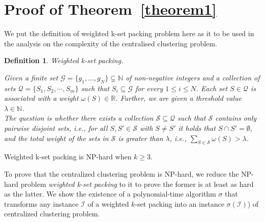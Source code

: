 \documentclass[10pt,journal,compsoc]{IEEEtran}
\makeatletter
\theoremstyle{mytheoremstyle}
\theoremstyle{mytheoremstyle}
\theoremstyle{mytheoremstyle}
\newtheorem{mydef}{Definition}%
\renewenvironment{proof}[1][\proofname]{%
      \par\pushQED{\qed}\fontfamily{ptm}\selectfont%
      \topsep6\p@\@plus6\p@\relax
      \trivlist\item[\hskip\labelsep\bfseries#1\@addpunct{.}]%
      \ignorespaces
    }{%
      \popQED\endtrivlist\@endpefalse
    }
\makeatother
\begin{document}
\section*{Proof of Theorem~\ref{theorem1}}
\label{proof_theorem1}
\begin{proof}
We put the definition of weighted k-set packing problem here as it to be used in the analysis on the complexity of the centralised clustering problem.

\begin{mydef}
\label{def_kset_packing}
\textit{Weighted k-set packing.} 

Given a finite set $\mathcal{G} = \{ g_1, \ldots , g_N \} \subsetneq \mathbb{N}$ of non-negative integers and a collection of sets $\mathcal{Q}=\{S_1,S_2,\cdots,S_m\}$ such that $S_i \subseteq \mathcal{G}$ for every $1 \leq i \leq N$.
Each set $S \in \mathcal{Q}$ is associated with a weight $\omega(S) \in \mathbb{R}$.
Further, we are given a threshold value $\lambda \in \mathbb{N}$.\\
The question is whether there exists a collection $\mathcal{S} \subseteq \mathcal{Q}$ such that $\mathcal{S}$ contains only pairwise disjoint sets, i.e., for all $S, S' \in \mathcal{S}$ with $S \neq S'$ it holds that $S \cap S' = \emptyset$, and the total weight of the sets in $\mathcal{S}$ is greater than $\lambda$, i.e., $\sum_{S \in \mathcal{S}} \omega(S) > \lambda$.
\end{mydef}

Weighted k-set packing is NP-hard when $k\geqslant 3$.~\cite{Computers_a_Intractability}

To prove that the centralized clustering problem is NP-hard, we reduce the NP-hard problem \textit{weighted k-set packing} to it to prove the former is at least as hard as the latter.
We show the existence of a polynomial-time algorithm $\sigma$ that transforms any instance $\mathcal{I}$ of a weighted $k$-set packing into an instance $\sigma(\mathcal{I})$) of centralized clustering problem.


\end{proof}
\end{document}
